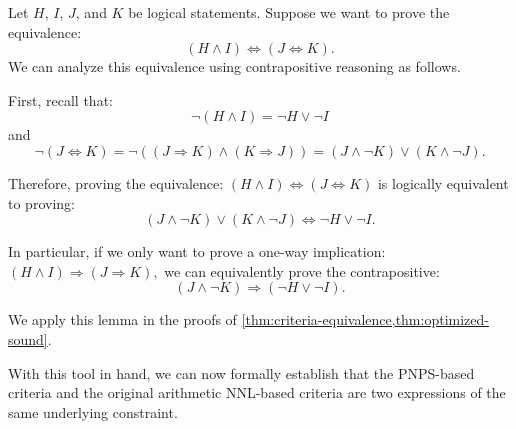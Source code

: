 \begin{lemma}\label{lemma}
Let $H$, $I$, $J$, and $K$ be logical statements. Suppose we want to prove the equivalence:
\[
(H \wedge I) \Leftrightarrow (J \Leftrightarrow K).
\]
We can analyze this equivalence using contrapositive reasoning as follows.

First, recall that:
\[
\neg(H \wedge I) = \neg H \vee \neg I
\]
and
\[
\neg(J \Leftrightarrow K) = \neg\left((J \Rightarrow K) \wedge (K \Rightarrow J)\right) = (J \wedge \neg K) \vee (K \wedge \neg J).
\]

Therefore, proving the equivalence:
\(
(H \wedge I) \Leftrightarrow (J \Leftrightarrow K)
\)
is logically equivalent to proving:
\[
(J \wedge \neg K) \vee (K \wedge \neg J) \Leftrightarrow \neg H \vee \neg I.
\]

In particular, if we only want to prove a one-way implication:
\(
(H \wedge I) \Rightarrow (J \Rightarrow K),
\)
we can equivalently prove the contrapositive:
\[
(J \wedge \neg K) \Rightarrow (\neg H \vee \neg I).
\]
\end{lemma}

\noindent We apply this lemma in the proofs of \cref{thm:criteria-equivalence,thm:optimized-sound}.

With this tool in hand, we can now formally establish that the \ac{PNPS}-based criteria and the original arithmetic \ac{NNL}-based criteria are two expressions of the same underlying constraint.

